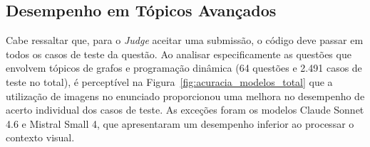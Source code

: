 \documentclass[sigconf]{acmart}
\begin{document}
\begin{table}[H]
  \centering
  \caption{Comparativo de Desempenho dos Modelos Multimodais com Imagens}
  \label{tab:desempenho_modelos_com_imagens}
\end{table}

\subsection{Desempenho em Tópicos Avançados}
\label{subsec:desempenho_em_topicos}

Cabe ressaltar que, para o \textit{Judge} aceitar uma submissão, o código deve passar em todos os casos de teste da questão. Ao analisar especificamente as questões que envolvem tópicos de grafos e programação dinâmica (64 questões e 2.491 casos de teste no total), é perceptível na Figura~\ref{fig:acuracia_modelos_total} que a utilização de imagens no enunciado proporcionou uma melhora no desempenho de acerto individual dos casos de teste. As exceções foram os modelos Claude Sonnet 4.6 e Mistral Small 4, que apresentaram um desempenho inferior ao processar o contexto visual.
\end{document}

